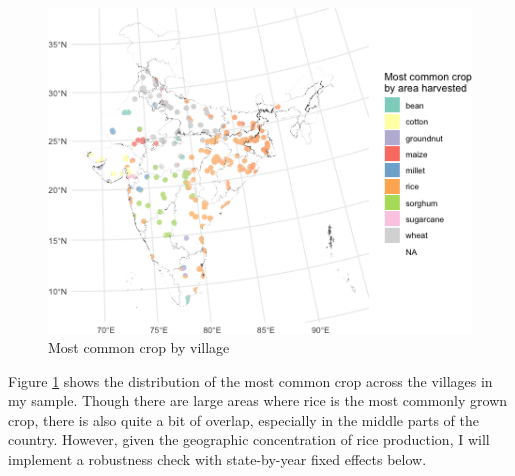\documentclass[
]{article}
\begin{document}
\begin{figure}
\includegraphics{draft_files/figure-latex/crops-1} \caption[Most common crop by village]{Most common crop by village}\label{fig:crops}
\end{figure}

Figure \ref{fig:crops} shows the distribution of the most common crop across the villages in my sample. Though there are large areas where rice is the most commonly grown crop, there is also quite a bit of overlap, especially in the middle parts of the country. However, given the geographic concentration of rice production, I will implement a robustness check with state-by-year fixed effects below.
\end{document}
